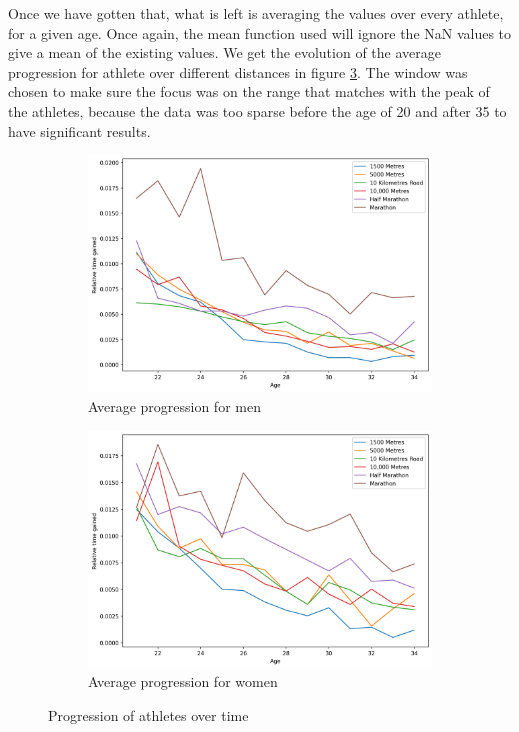 \documentclass[10pt, a4paper]{article}
\begin{document}
Once we have gotten that, what is left is averaging the values over every athlete, for a given age. Once again, the mean function used will ignore the NaN values to give a mean of the existing values. We get the evolution of the average progression for athlete over different distances in figure \ref{fig:athletes_progression}. The window was chosen to make sure the focus was on the range that matches with the peak of the athletes, because the data was too sparse before the age of 20 and after 35 to have significant results.

\begin{figure}[htb]
    \centering
    \begin{subfigure}[b]{0.45\linewidth}
        \includegraphics[width=\linewidth]{Data/Figures/Men_Athletes_progression.png}
        \caption{Average progression for men}
        \label{fig:men_progression}
    \end{subfigure}
    \hfill
    \begin{subfigure}[b]{0.45\linewidth}
        \includegraphics[width=\linewidth]{Data/Figures/Women_Athletes_progression.png}
        \caption{Average progression for women}
        \label{fig:women_progression}
    \end{subfigure}
    \caption{Progression of athletes over time}
    \label{fig:athletes_progression}
\end{figure}
\end{document}

